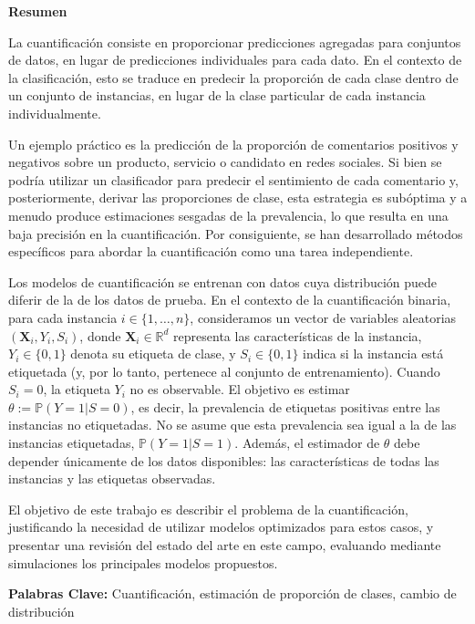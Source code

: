 \begin{center}
  \textbf{\Large Resumen}\label{resumen}
\end{center}

La cuantificación consiste en proporcionar predicciones agregadas para conjuntos
de datos, en lugar de predicciones individuales para cada dato. En el contexto
de la clasificación, esto se traduce en predecir la proporción de cada clase
dentro de un conjunto de instancias, en lugar de la clase particular de cada
instancia individualmente.

Un ejemplo práctico es la predicción de la proporción de comentarios positivos y
negativos sobre un producto, servicio o candidato en redes sociales. Si bien se
podría utilizar un clasificador para predecir el sentimiento de cada comentario
y, posteriormente, derivar las proporciones de clase, esta estrategia es
subóptima y a menudo produce estimaciones sesgadas de la prevalencia, lo que
resulta en una baja precisión en la cuantificación. Por consiguiente, se han
desarrollado métodos específicos para abordar la cuantificación como una tarea
independiente.

Los modelos de cuantificación se entrenan con datos cuya distribución puede
diferir de la de los datos de prueba. En el contexto de la cuantificación
binaria, para cada instancia $i \in \{1,\dots,n\}$, consideramos un vector de
variables aleatorias $(\boldsymbol{X}_i,Y_i,S_i)$, donde $\boldsymbol{X}_i \in
\mathbb{R}^d$ representa las características de la instancia, $Y_i \in \{0, 1\}$
denota su etiqueta de clase, y $S_i \in \{0, 1\}$ indica si la instancia está
etiquetada (y, por lo tanto, pertenece al conjunto de entrenamiento). Cuando
$S_i = 0$, la etiqueta $Y_i$ no es observable. El objetivo es estimar $\theta :=
\mathbb{P}(Y=1|S=0)$, es decir, la prevalencia de etiquetas positivas entre las
instancias no etiquetadas. No se asume que esta prevalencia sea igual a la de
las instancias etiquetadas, $\mathbb{P}(Y=1|S=1)$. Además, el estimador de
$\theta$ debe depender únicamente de los datos disponibles: las características
de todas las instancias y las etiquetas observadas.

El objetivo de este trabajo es describir el problema de la cuantificación,
justificando la necesidad de utilizar modelos optimizados para estos casos, y
presentar una revisión del estado del arte en este campo, evaluando mediante
simulaciones los principales modelos propuestos.

\bigskip

\textbf{Palabras Clave:} Cuantificación, estimación de proporción de clases,
cambio de distribución